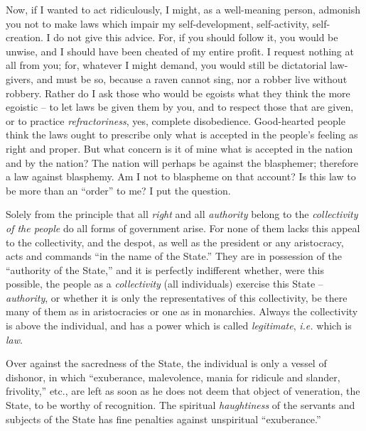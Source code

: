 Now, if I wanted to act ridiculously, I might, as a well-meaning person, 
admonish you not to make laws which impair my self-development, self-activity, 
self-creation. I do not give this advice. For, if you should follow it, you 
would be unwise, and I should have been cheated of my entire profit. I request 
nothing at all from you; for, whatever I might demand, you would still be 
dictatorial law-givers, and must be so, because a raven cannot sing, nor a 
robber live without robbery. Rather do I ask those who would be egoists what 
they think the more egoistic -- to let laws be given them by you, and to 
respect those that are given, or to practice \textit{refractoriness}, yes, 
complete disobedience. Good-hearted people think the laws ought to prescribe 
only what is accepted in the people's feeling as right and proper. But what 
concern is it of mine what is accepted in the nation and by the nation? The 
nation will perhaps be against the blasphemer; therefore a law against 
blasphemy. Am I not to blaspheme on that account? Is this law to be more than 
an ``order'' to me? I put the question.

Solely from the principle that all \textit{right} and all \textit{authority} 
belong to the \textit{collectivity of the people} do all forms of government 
arise. For none of them lacks this appeal to the collectivity, and the despot, 
as well as the president or any aristocracy, acts and commands ``in the name 
of the State.'' They are in possession of the ``authority of the State,'' 
and it is perfectly indifferent whether, were this possible, the people as a 
\textit{collectivity} (all individuals) exercise this State -- 
\textit{authority}, or whether it is only the representatives of this 
collectivity, be there many of them as in aristocracies or one as in 
monarchies. Always the collectivity is above the individual, and has a power 
which is called \textit{legitimate}, \textit{i.e.} which is \textit{law}.

Over against the sacredness of the State, the individual is only a vessel of 
dishonor, in which ``exuberance, malevolence, mania for ridicule and slander, 
frivolity,'' etc., are left as soon as he does not deem that object of 
veneration, the State, to be worthy of recognition. The spiritual 
\textit{haughtiness} of the servants and subjects of the State has fine 
penalties against unspiritual ``exuberance.''

